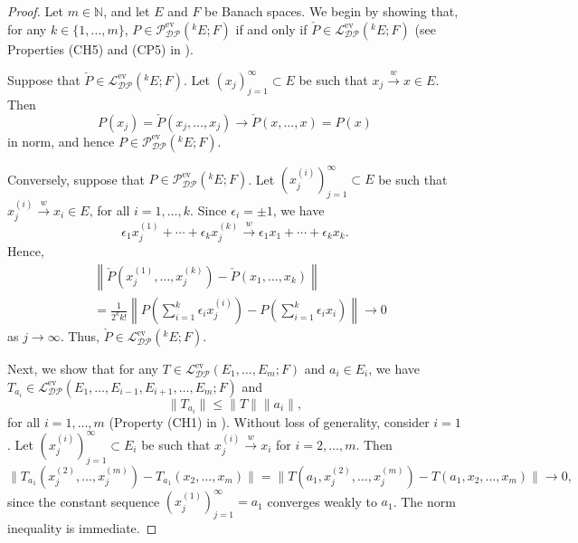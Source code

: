 \documentclass[12 pt]{article}%
\newtheorem{final remark}[theorem]{Final Remark}
\begin{document}
\begin{proof}
		
Let $m \in \mathbb{N}$, and let $E$ and $F$ be Banach spaces. We begin by showing that, for any $k \in \{1,\dots,m\}$, $P \in \mathcal{P_{DP}^{\mathrm{ev}}}(^kE;F)$ if and only if $\check{P} \in \mathcal{L_{DP}^{\mathrm{ev}}}(^kE;F)$ (see Properties (CH5) and (CP5) in \cite[Definitions 2.1 and 2.2]{PR14}).

Suppose that $\check{P} \in \mathcal{L_{DP}^{\mathrm{ev}}}(^kE;F)$. Let $(x_j)_{j=1}^{\infty} \subset E$ be such that $x_j \overset{w}{\to} x \in E$. Then
\begin{equation*}
	P(x_j) = \check{P}(x_j,\dots,x_j) \longrightarrow \check{P}(x,\dots,x) = P(x)
\end{equation*}
in norm, and hence $P \in \mathcal{P_{DP}^{\mathrm{ev}}}(^kE;F)$.

Conversely, suppose that $P \in \mathcal{P_{DP}^{\mathrm{ev}}}(^kE;F)$. Let $(x_j^{(i)})_{j=1}^{\infty} \subset E$ be such that $x_j^{(i)} \overset{w}{\to} x_i \in E$, for all $i=1,\dots,k$. Since $\epsilon_i = \pm 1$, we have
\begin{equation*}
	\epsilon_1 x_j^{(1)} + \cdots + \epsilon_k x_j^{(k)} \overset{w}{\longrightarrow} \epsilon_1 x_1 + \cdots + \epsilon_k x_k.
\end{equation*}
Hence,
\begin{align*}
	&\left\|\check{P}(x_j^{(1)},\dots,x_j^{(k)}) - \check{P}(x_1,\dots,x_k)\right\| \\
	&= \frac{1}{2^k k!} \left\| P\!\left(\sum_{i=1}^k \epsilon_i x_j^{(i)}\right) - P\!\left(\sum_{i=1}^k \epsilon_i x_i\right) \right\| \longrightarrow 0
\end{align*}
as $j \to \infty$. Thus, $\check{P} \in \mathcal{L_{DP}^{\mathrm{ev}}}(^kE;F)$.

Next, we show that for any $T \in \mathcal{L_{DP}^{\mathrm{ev}}}(E_1,\dots,E_m;F)$ and $a_i \in E_i$, we have $T_{a_i} \in \mathcal{L_{DP}^{\mathrm{ev}}}(E_1,\dots,E_{i-1},E_{i+1},\dots,E_m;F)$ and
\begin{equation*}
	\|T_{a_i}\| \le \|T\| \|a_i\|,
\end{equation*}
for all $i=1,\dots,m$ (Property (CH1) in \cite[Definition 2.1]{PR14}). Without loss of generality, consider $i=1$. Let $(x_j^{(i)})_{j=1}^{\infty} \subset E_i$ be such that $x_j^{(i)} \overset{w}{\to} x_i$ for $i=2,\dots,m$. Then
\begin{equation*}
	\|T_{a_1}(x_j^{(2)},\dots,x_j^{(m)}) - T_{a_1}(x_2,\dots,x_m)\|
	= \|T(a_1,x_j^{(2)},\dots,x_j^{(m)}) - T(a_1,x_2,\dots,x_m)\| \to 0,
\end{equation*}
since the constant sequence $(x_j^{(1)})_{j=1}^{\infty}=a_1$ converges weakly to $a_1$. The norm inequality is immediate.


\end{proof}
\end{document}
